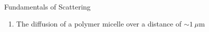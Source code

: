 \begin{activity}{Fundamentals of Scattering}
\begin{ctqs}
\begin{enumerate}
			\item The diffusion of a polymer micelle over a distance of $\sim 1~\mu$m
			
				\begin{solution}[0.5in]
				\end{solution}
			
		\end{enumerate}
	
\end{ctqs}



	


%
%	


	
\end{activity}